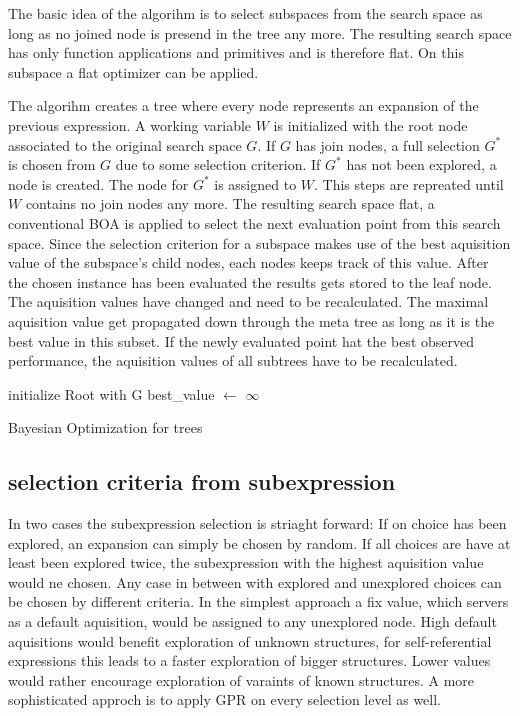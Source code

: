 \documentclass[english]{article}
\begin{document}
The basic idea of the algorihm is to select subspaces from the search space as long as no joined node is presend in the tree any more. The resulting search space has only function applications and primitives and is therefore flat. On this subspace a flat optimizer can be applied.

The algorihm creates a tree where every node represents an expansion of the previous expression. A working variable $W$ is initialized with the root node associated to the original search space $G$. If $G$ has join nodes, a full selection $G^*$ is chosen from $G$ due to some selection criterion. If $G^*$ has not been explored, a node is created. The node for $G^*$ is assigned to $W$. This steps are repreated until $W$ contains no join nodes any more. The resulting search space flat, a conventional \ac{BOA} is applied to select the next evaluation point from this search space. Since the selection criterion for a subspace makes use of the best aquisition value of the subspace's child nodes, each nodes keeps track of this value. After the chosen instance has been evaluated the results gets stored to the leaf node. The aquisition values have changed and need to be recalculated. The maximal aquisition value get propagated down through the meta tree as long as it is the best value in this subset. If the newly evaluated point hat the best observed performance, the aquisition values of all subtrees have to be recalculated.



\begin{algorithm}[H]
\SetAlgoLined
initialize Root with G\;
best\_value $\leftarrow$ $\infty$\;


\caption{Bayesian Optimization for trees}

\end{algorithm}
%
\subsection*{selection criteria from subexpression}
In two cases the subexpression selection is striaght forward: If on choice has been explored, an expansion can simply be chosen by random. If all choices are have at least been explored twice, the subexpression with the highest aquisition value would ne chosen. Any case in between with explored and unexplored choices can be chosen by different criteria.
In the simplest approach a fix value, which servers as a default aquisition, would be assigned to any unexplored node. High default aquisitions would benefit exploration of unknown structures, for self-referential expressions this leads to a faster exploration of bigger structures. Lower values would rather encourage exploration of varaints of known structures.
A more sophisticated approch is to apply \ac{GPR} on every selection level as well.
\end{document}
